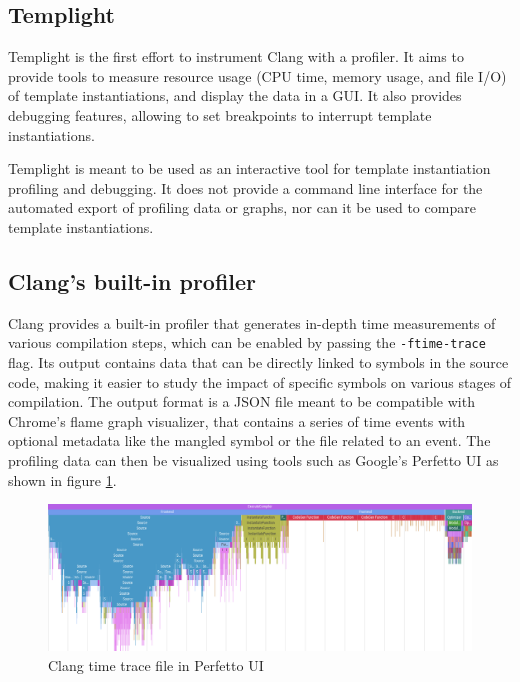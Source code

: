 \documentclass[../main]{subfiles}
\begin{document}
\subsection{
  Templight
}

Templight \cite{templight} is the first effort to instrument Clang with a
profiler. It aims to provide tools to measure resource usage (CPU time,
memory usage, and file I/O) of template instantiations, and display the
data in a GUI. It also provides debugging features, allowing to set breakpoints
to interrupt template instantiations.

Templight is meant to be used as an interactive tool for template instantiation
profiling and debugging. It does not provide a command line interface for the
automated export of profiling data or graphs, nor can it be used to compare
template instantiations.

\subsection{
  Clang's built-in profiler
}

Clang provides a built-in profiler \cite{time-trace} that generates
in-depth time measurements of various compilation steps, which can be enabled by
passing the \lstinline{-ftime-trace} flag. Its output contains data that can be
directly linked to symbols in the source code, making it easier to study the
impact of specific symbols on various stages of compilation. The output format
is a JSON file meant to be compatible with Chrome's flame graph visualizer, that
contains a series of time events with optional metadata like the mangled \cpp
symbol or the file related to an event. The profiling data can then be
visualized using tools such as Google's Perfetto UI as shown in figure
\ref{fig:perfetto-time-trace-ui}.

\begin{figure}[h]
\includegraphics[scale=0.425, angle=90]{images/perfetto-ui.png}
\caption{Clang time trace file in Perfetto UI}
\label{fig:perfetto-time-trace-ui}
\clearpage
\end{figure}
\end{document}
